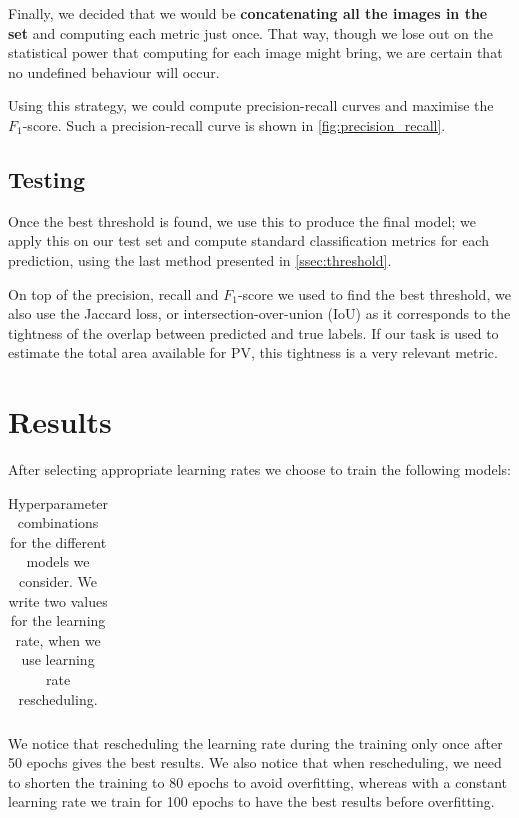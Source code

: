 \documentclass[10pt,conference]{IEEEtran}
\begin{document}
Finally, we decided that we would be \textbf{concatenating all the images
in the set} and computing each metric just once.
That way, though we lose out on the statistical power
that computing for each image might bring, we are
certain that no undefined behaviour will occur.

Using this strategy, we could compute precision-recall curves and maximise the $F_1$-score. Such a precision-recall curve is shown in \autoref{fig:precision_recall}.

\subsection{Testing}
Once the best threshold is found, we use this to produce
the final model; we apply this on our test set and compute
standard classification metrics for each prediction,
using the last method presented in \autoref{ssec:threshold}.

On top of the precision, recall and $F_1$-score we used
to find the best threshold, we also use the
Jaccard loss, or intersection-over-union (IoU) as
it corresponds to the tightness of the overlap between
predicted and true labels.
If our task is used to estimate the total area available
for PV, this tightness is a very relevant metric.


\section{Results}
After selecting appropriate learning rates we choose to train the following models:
\begin{table}
    \begin{center}
        \begin{tabular}{||c | c c c c||}
             \hline
             
        \end{tabular}
    \end{center}
    \caption{Hyperparameter combinations for the different models we consider. We write two values for the learning rate, when we use learning rate rescheduling. 
    }
    \label{tbl:model_parameters}
\end{table} 



We notice that rescheduling the learning rate during the training only once after 50 epochs gives the best results.
We also notice that when rescheduling, we need to shorten the training to 80 epochs to avoid overfitting,
whereas with a constant learning rate we train for 100 epochs to have the best results before overfitting.
\end{document}
